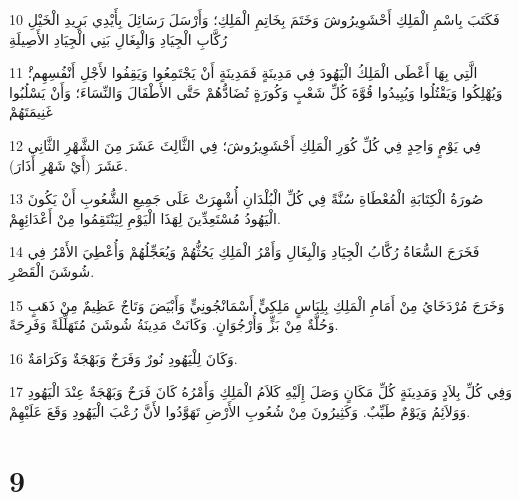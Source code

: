 \par 10 فَكَتَبَ بِاسْمِ الْمَلِكِ أَحْشَوِيرُوشَ وَخَتَمَ بِخَاتِمِ الْمَلِكِ؛ وَأَرْسَلَ رَسَائِلَ بِأَيْدِي بَرِيدِ الْخَيْلِ رُكَّابِ الْجِيَادِ وَالْبِغَالِ بَنِي الْجِيَادِ الأَصِيلَةِ
\par 11 الَّتِي بِهَا أَعْطَى الْمَلِكُ الْيَهُودَ فِي مَدِينَةٍ فَمَدِينَةٍ أَنْ يَجْتَمِعُوا وَيَقِفُوا لأَجْلِ أَنْفُسِهِم؛ْ وَيُهْلِكُوا وَيَقْتُلُوا وَيُبِيدُوا قُوَّةَ كُلِّ شَعْبٍ وَكُورَةٍ تُضَادُّهُمْ حَتَّى الأَطْفَالَ وَالنِّسَاءَ؛ وَأَنْ يَسْلُبُوا غَنِيمَتَهُمْ
\par 12 فِي يَوْمٍ وَاحِدٍ فِي كُلِّ كُوَرِ الْمَلِكِ أَحْشَوِيرُوشَ؛ فِي الثَّالِثَ عَشَرَ مِنَ الشَّهْرِ الثَّانِي عَشَرَ (أَيْ شَهْرِ أَذَارَ).
\par 13 صُورَةُ الْكِتَابَةِ الْمُعْطَاةِ سُنَّةً فِي كُلِّ الْبُلْدَانِ أُشْهِرَتْ عَلَى جَمِيعِ الشُّعُوبِ أَنْ يَكُونَ الْيَهُودُ مُسْتَعِدِّينَ لِهَذَا الْيَوْمِ لِيَنْتَقِمُوا مِنْ أَعْدَائِهِمْ.
\par 14 فَخَرَجَ السُّعَاةُ رُكَّابُ الْجِيَادِ وَالْبِغَالِ وَأَمْرُ الْمَلِكِ يَحُثُّهُمْ وَيُعَجِّلُهُمْ وَأُعْطِيَ الأَمْرُ فِي شُوشَنَ الْقَصْرِ.
\par 15 وَخَرَجَ مُرْدَخَايُ مِنْ أَمَامِ الْمَلِكِ بِلِبَاسٍ مَلِكِيٍّ أَسْمَانْجُونِيٍّ وَأَبْيَضَ وَتَاجٌ عَظِيمٌ مِنْ ذَهَبٍ وَحُلَّةٌ مِنْ بَزٍّ وَأُرْجُوَانٍ. وَكَانَتْ مَدِينَةُ شُوشَنَ مُتَهَلِّلَةً وَفَرِحَةً.
\par 16 وَكَانَ لِلْيَهُودِ نُورٌ وَفَرَحٌ وَبَهْجَةٌ وَكَرَامَةٌ.
\par 17 وَفِي كُلِّ بِلاَدٍ وَمَدِينَةٍ كُلِّ مَكَانٍ وَصَلَ إِلَيْهِ كَلاَمُ الْمَلِكِ وَأَمْرُهُ كَانَ فَرَحٌ وَبَهْجَةٌ عِنْدَ الْيَهُودِ وَوَلاَئِمُ وَيَوْمٌ طَيِّبٌ. وَكَثِيرُونَ مِنْ شُعُوبِ الأَرْضِ تَهَوَّدُوا لأَنَّ رُعْبَ الْيَهُودِ وَقَعَ عَلَيْهِمْ.

\chapter{9}

